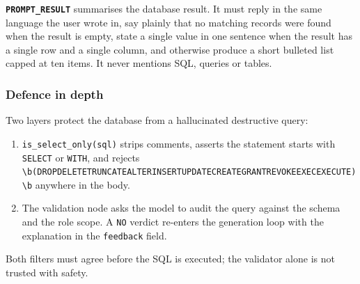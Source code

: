\textbf{\texttt{PROMPT\_RESULT}} summarises the database result. It must reply in the same language the user wrote in, say plainly that no matching records were found when the result is empty, state a single value in one sentence when the result has a single row and a single column, and otherwise produce a short bulleted list capped at ten items. It never mentions SQL, queries or tables.

\subsubsection*{Defence in depth}

Two layers protect the database from a hallucinated destructive query:
\begin{enumerate}
    \item \texttt{is\_select\_only(sql)} strips comments, asserts the statement starts with \texttt{SELECT} or \texttt{WITH}, and rejects \texttt{\textbackslash b(DROP\textbar DELETE\textbar TRUNCATE\textbar ALTER\textbar INSERT\textbar UPDATE\textbar CREATE\textbar GRANT\textbar REVOKE\textbar EXEC\textbar EXECUTE)\textbackslash b} anywhere in the body.
    \item The validation node asks the model to audit the query against the schema and the role scope. A \texttt{NO} verdict re-enters the generation loop with the explanation in the \texttt{feedback} field.
\end{enumerate}
Both filters must agree before the SQL is executed; the validator alone is not trusted with safety.
